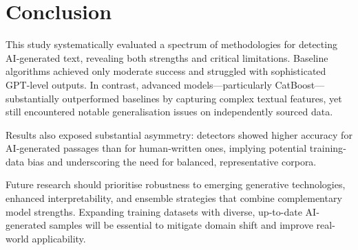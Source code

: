 
\section{Conclusion}  %

This study systematically evaluated a spectrum of methodologies for
detecting AI‐generated text, revealing both strengths and critical
limitations. Baseline algorithms achieved only moderate success and
struggled with sophisticated GPT-level outputs. In contrast, advanced
models—particularly CatBoost—substantially outperformed baselines by
capturing complex textual features, yet still encountered notable
generalisation issues on independently sourced data.

Results also exposed substantial asymmetry: detectors showed higher
accuracy for AI‐generated passages than for human‐written ones, implying
potential training‐data bias and underscoring the need for balanced,
representative corpora.

Future research should prioritise robustness to emerging generative
technologies, enhanced interpretability, and ensemble strategies that
combine complementary model strengths. Expanding training datasets with
diverse, up-to-date AI‐generated samples will be essential to mitigate
domain shift and improve real-world applicability.
